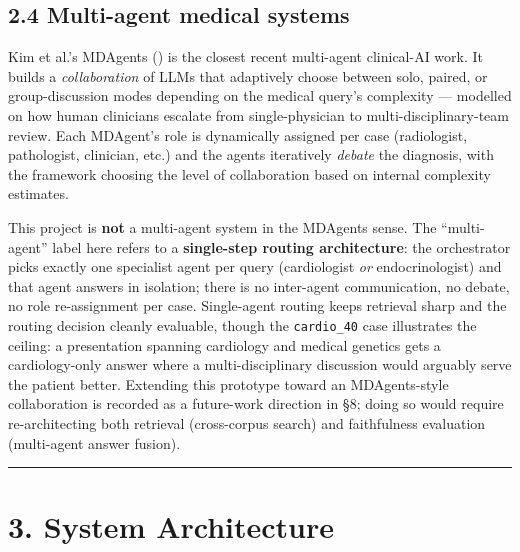 \documentclass[
  american,
  a4paper,
]{article}
\begin{document}
\subsection{2.4 Multi-agent medical
systems}\label{multi-agent-medical-systems}

Kim et al.'s MDAgents ()
is the closest recent multi-agent clinical-AI work. It builds a
\emph{collaboration} of LLMs that adaptively choose between solo,
paired, or group-discussion modes depending on the medical query's
complexity --- modelled on how human clinicians escalate from
single-physician to multi-disciplinary-team review. Each MDAgent's role
is dynamically assigned per case (radiologist, pathologist, clinician,
etc.) and the agents iteratively \emph{debate} the diagnosis, with the
framework choosing the level of collaboration based on internal
complexity estimates.

This project is \textbf{not} a multi-agent system in the MDAgents sense.
The ``multi-agent'' label here refers to a \textbf{single-step routing
architecture}: the orchestrator picks exactly one specialist agent per
query (cardiologist \emph{or} endocrinologist) and that agent answers in
isolation; there is no inter-agent communication, no debate, no role
re-assignment per case. Single-agent routing keeps retrieval sharp and
the routing decision cleanly evaluable, though the \texttt{cardio\_40}
case illustrates the ceiling: a presentation spanning cardiology and
medical genetics gets a cardiology-only answer where a
multi-disciplinary discussion would arguably serve the patient better.
Extending this prototype toward an MDAgents-style collaboration is
recorded as a future-work direction in §8; doing so would require
re-architecting both retrieval (cross-corpus search) and faithfulness
evaluation (multi-agent answer fusion).

\begin{center}\rule{0.5\linewidth}{0.5pt}\end{center}

\section{3. System Architecture}\label{system-architecture}
\end{document}
